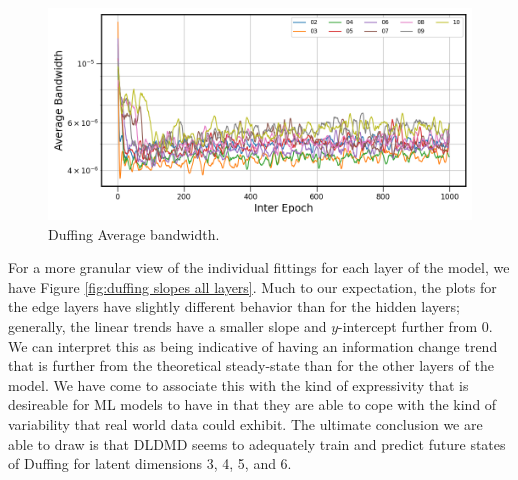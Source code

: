 \begin{figure}[!ht]
    \centering
    \begin{minipage}{\textwidth}
        \includegraphics[width=\textwidth]{"../Figures/duffing_bandwidth_averages_plot.png"} 
    \end{minipage} 
    \caption{Duffing Average bandwidth.}
    \label{fig:duffing average bandwidth}
\end{figure}

For a more granular view of the individual fittings for each layer of the model, we have Figure
\ref{fig:duffing slopes all layers}. Much to our 
expectation, the plots for the edge layers have slightly different behavior than for the hidden layers;
generally, the linear trends have a smaller slope and $y$-intercept further from 0. We can interpret this 
as being indicative of having an information change trend that is further from the theoretical steady-state
than for the other layers of the model. We have come to associate this with the kind of expressivity that is
desireable for ML models to have in that they are able to cope with the kind of variability that real world 
data could exhibit. The ultimate conclusion we are able to draw is that DLDMD seems to adequately train and 
predict future states of Duffing for latent dimensions 3, 4, 5, and 6.


